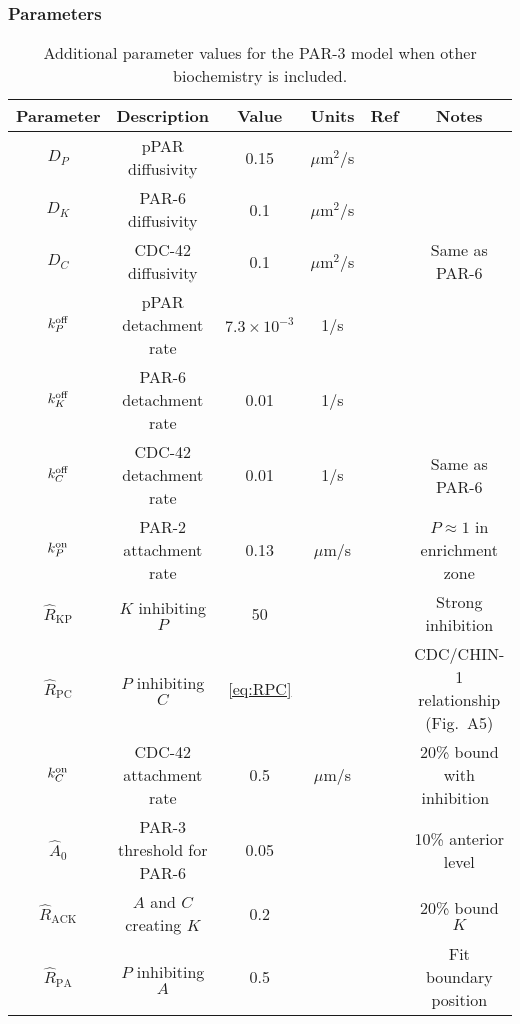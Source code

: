 \documentclass[11pt]{article}
\newcommand{\6}[1]{#1_{\text{6}}}
\newcommand{\3}[1]{#1_{\text{3}}}
\begin{document}
\subsubsection{Parameters \label{sec:param23}}
\begin{table}
\begin{small}
\centering
\begin{tabular}{|c|c|c|c|c|c|}\hline
Parameter & Description & Value & Units & Ref & Notes \\ \hline
$D_P$ & pPAR diffusivity & 0.15 & $\mu$m$^2$/s & \cite{goehring2011polarization}&  \\ 
$D_K$ & PAR-6 diffusivity & 0.1 & $\mu$m$^2$/s & \cite{robin2014single}&  \\ 
$D_C$ & CDC-42 diffusivity & 0.1 & $\mu$m$^2$/s && Same as PAR-6 \\ 
$k^\text{off}_P$ & pPAR detachment rate & $7.3 \times 10^{-3}$ & 1/s & \cite{goehring2011polarization}&  \\  
$k^\text{off}_K$ & PAR-6 detachment rate & 0.01 & 1/s & \cite{robin2014single}&  \\  
$k^\text{off}_C$ & CDC-42 detachment rate & 0.01 & 1/s & &  Same as PAR-6\\  \hline
$k^\text{on}_P$ & PAR-2 attachment rate & 0.13 & $\mu$m/s & \cite{gross2019guiding} & $P \approx 1$ in enrichment zone\\
$\hat{R}_\text{KP}$ & $K$ inhibiting $P$ &50  &  &  & Strong inhibition\\
$\hat R_\text{PC}$ & $P$ inhibiting $C$ & \eqref{eq:RPC}  & & \cite{sailer2015dynamic} & CDC/CHIN-1 relationship (Fig.\ A5)\\ 
$k^\text{on}_C$ & CDC-42 attachment rate & 0.5 & $\mu$m/s & & 20\% bound with inhibition\ \\ 
$\hat A_0$ & PAR-3 threshold for PAR-6 & 0.05&  & \cite{sailer2015dynamic}& 10\% anterior level \\
$\hat{R}_\text{ACK}$ & $A$ and $C$ creating $K$ & 0.2  &  &  & 20\% bound $K$\\
$\hat{R}_\text{PA}$ & $P$ inhibiting $A$ & 0.5  &  &  & Fit boundary position\\ \hline
\end{tabular}
\caption{\label{tab:paramsBC}Additional parameter values for the PAR-3 model when other biochemistry is included.}
\end{small}
\end{table}
\end{document}
